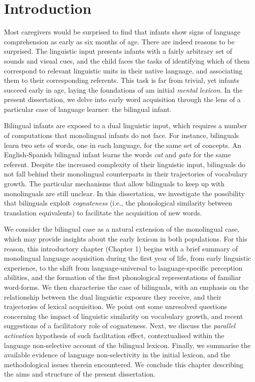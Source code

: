 \documentclass[
  12pt,
  b5paperpaper,
  twoside]{scrreprt}
\begin{document}
\markboth{}{}



\hypertarget{sec-introduction}{%
\chapter{Introduction}\label{sec-introduction}}

Most caregivers would be surprised to find that infants show signs of
language comprehension as early as six months of age. There are indeed
reasons to be surprised. The linguistic input presents infants with a
fairly arbitrary set of sounds and visual cues, and the child faces the
tasks of identifying which of them correspond to relevant linguistic
units in their native language, and associating them to their
corresponding referents. This task is far from trivial, yet infants
succeed early in age, laying the foundations of am initial \emph{mental
lexicon}. In the present dissertation, we delve into early word
acquisition through the lens of a particular case of language learner:
the bilingual infant.

Bilingual infants are exposed to a dual linguistic input, which requires
a number of computations that monolingual infants do not face. For
instance, bilinguals learn two sets of words, one in each language, for
the same set of concepts. An English-Spanish bilingual infant learns the
words \emph{cat} and \emph{gato} for the same referent. Despite the
increased complexity of their linguistic input, bilinguals do not fall
behind their monolingual counterparts in their trajectories of
vocabulary growth. The particular mechanisms that allow bilinguals to
keep up with monolinguals are still unclear. In this dissertation, we
investigate the possibility that bilinguals exploit \emph{cognateness}
(i.e., the phonological similarity between translation equivalents) to
facilitate the acquisition of new words.

We consider the bilingual case as a natural extension of the monolingual
case, which may provide insights about the early lexicon in both
populations. For this reason, this introductory chapter (Chapter 1)
begins with a brief summary of monolingual language acquisition during
the first year of life, from early linguistic experience, to the shift
from language-universal to language-specific perception abilities, and
the formation of the first phonological representations of familiar
word-forms. We then characterise the case of bilinguals, with an
emphasis on the relationship between the dual linguistic exposure they
receive, and their trajectories of lexical acquisition. We point out
some unresolved questions concerning the impact of linguistic similarity
on vocabulary growth, and recent suggestions of a facilitatory role of
cognateness. Next, we discuss the \emph{parallel activation} hypothesis
of such facilitation effect, contextualised within the language
non-selective account of the bilingual lexicon. Finally, we summarise
the available evidence of language non-selectivity in the initial
lexicon, and the methodological issues therein encountered. We conclude
this chapter describing the aims and structure of the present
dissertation.
\end{document}
